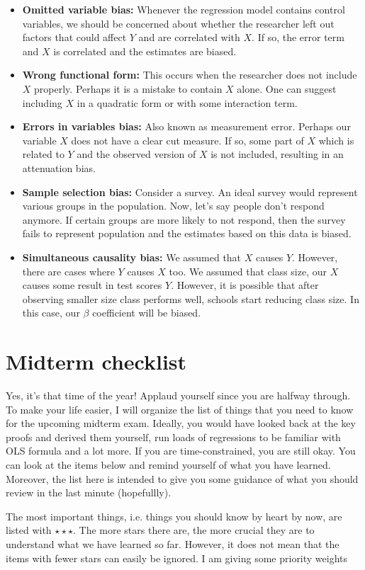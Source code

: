 \documentclass[12pt]{article}
\theoremstyle{definition}
\theoremstyle{property}
\theoremstyle{assumption}
\theoremstyle{example}
\theoremstyle{comment}
\begin{document}
\begin{itemize}
\item \textbf{Omitted variable bias: }Whenever the regression model contains control variables, we should be concerned about whether the researcher left out factors that could affect $Y$ and are correlated with $X$. If so, the error term and $X$ is correlated and the estimates are biased. 
\item \textbf{Wrong functional form: }This occurs when the researcher does not include $X$ properly. Perhaps it is a mistake to contain $X$ alone. One can suggest including $X$ in a quadratic form or with some interaction term.  
\item \textbf{Errors in variables bias: }Also known as measurement error. Perhaps our variable $X$ does not have a clear cut measure. If so, some part of $X$ which is related to $Y$ and the observed version of $X$ is not included, resulting in an attenuation bias.
\item \textbf{Sample selection bias: }Consider a survey. An ideal survey would represent various groups in the population. Now, let's say people don't respond anymore. If certain groups are more likely to not respond, then the survey fails to represent population and the estimates based on this data is biased.
\item \textbf{Simultaneous causality bias: }We assumed that $X$ causes $Y$. However, there are cases where $Y$ causes $X$ too.  We assumed that class size,  our $X$ causes some result in test scores $Y$. However, it is possible that after observing smaller size class performs well, schools start reducing class size. In this case, our $\beta$ coefficient will be biased. 
\end{itemize}

\section{Midterm checklist}
Yes, it's that time of the year! Applaud yourself since you are halfway through. To make your life easier, I will organize the list of things that you need to know for the upcoming midterm exam. Ideally, you would have looked back at the key proofs and derived them yourself, run loads of regressions to be familiar with OLS formula and a lot more. If you are time-constrained, you are still okay. You can look at the items below and remind yourself of what you have learned. Moreover, the list here is intended to give you some guidance of what you should review in the last minute (hopefullly). 
\par\medskip
The most important things, i.e. things you should know by heart by now, are listed with $\star\star\star$. The more stars there are, the more crucial they are to understand what we have learned so far. However, it does not mean that the items with fewer stars can easily be ignored. I am giving some priority weights %
\end{document}

